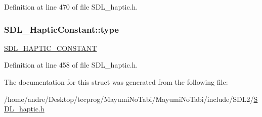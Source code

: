 Definition at line 470 of file S\-D\-L\-\_\-haptic.\-h.

\hypertarget{struct_s_d_l___haptic_constant_a5cb31202803a8bc1be95fcede5ac8afb}{
\subsubsection[{type}]{ S\-D\-L\-\_\-\-Haptic\-Constant\-::type}}\label{struct_s_d_l___haptic_constant_a5cb31202803a8bc1be95fcede5ac8afb}
\hyperlink{_s_d_l__haptic_8h_a955fb9f680dcf9cc72a3d5263e85b80a}{S\-D\-L\-\_\-\-H\-A\-P\-T\-I\-C\-\_\-\-C\-O\-N\-S\-T\-A\-N\-T} 

Definition at line 458 of file S\-D\-L\-\_\-haptic.\-h.



The documentation for this struct was generated from the following file\-:\begin{DoxyCompactItemize}
\item 
/home/andre/\-Desktop/tecprog/\-Mayumi\-No\-Tabi/\-Mayumi\-No\-Tabi/include/\-S\-D\-L2/\hyperlink{_s_d_l__haptic_8h}{S\-D\-L\-\_\-haptic.\-h}\end{DoxyCompactItemize}
